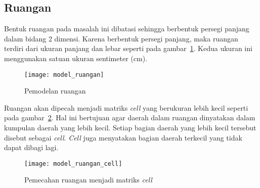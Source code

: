 \subsection{Ruangan}
Bentuk ruangan pada masalah ini dibatasi sehingga berbentuk persegi panjang dalam bidang 2 dimensi. Karena berbentuk persegi panjang, maka ruangan terdiri dari ukuran panjang dan lebar seperti pada gambar~\ref{fig:model_ruangan}. Kedua ukuran ini menggunakan satuan ukuran sentimeter (cm).

\begin{figure}[H]
	\centering  
	\texttt{[image: model\_ruangan]}
	\caption[Pemodelan ruangan]{Pemodelan ruangan} 
	\label{fig:model_ruangan}
\end{figure}


Ruangan akan dipecah menjadi matriks \textit{cell} yang berukuran lebih kecil seperti pada gambar~\ref{fig:model_ruangan_cell}. Hal ini bertujuan agar daerah dalam ruangan dinyatakan dalam kumpulan daerah yang lebih kecil. Setiap bagian daerah yang lebih kecil tersebut disebut sebagai \textit{cell}. \textit{Cell} juga menyatakan bagian daerah terkecil yang tidak dapat dibagi lagi.

\begin{figure}[h]
	\centering  
	\texttt{[image: model\_ruangan\_cell]}
	\caption[Pemecahan ruangan menjadi matriks \textit{cell}]{Pemecahan ruangan menjadi matriks \textit{cell}} 
	\label{fig:model_ruangan_cell}
\end{figure}

